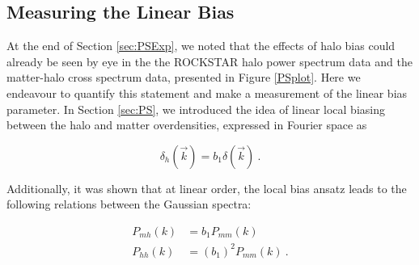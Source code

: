 \documentclass[10pt,letterpaper,final]{iopart}
\numberwithin{equation}{subsection}
\def\ni{\noindent}
\begin{document}
\subsection{Measuring the Linear Bias}\label{sec:linbiasexp}

At the end of Section \ref{sec:PSExp}, we noted that the effects of halo bias could already be seen by eye in the the ROCKSTAR halo power spectrum data and the matter-halo cross spectrum data, presented in Figure \ref{PSplot}. Here we endeavour to quantify this statement and make a measurement of the linear bias parameter. In Section \ref{sec:PS}, we introduced the idea of linear local biasing between the halo and matter overdensities, expressed in Fourier space as

\begin{equation} \label{eq:deltah_bias}
\delta_h(\vec{k}) = b_1 \delta(\vec{k}) \ .
\end{equation}

\ni Additionally, it was shown that at linear order, the local bias ansatz leads to the following relations between the Gaussian spectra:
 
\begin{align}
\label{eq:Pmh_bias2}P_{mh}(k) &= b_1 P_{mm}(k) \\
\label{eq:Phh_bias2}P_{hh}(k) &= (b_1)^2 P_{mm}(k) \ .
\end{align}
\end{document}
